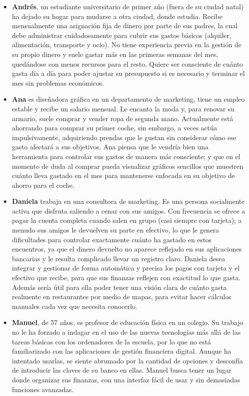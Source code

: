 \begin{itemize}
    \item \textbf{Andrés}, un estudiante universitario de primer año (fuera de su ciudad natal) ha dejado su hogar para mudarse a otra ciudad, donde estudia. Recibe mensualmente una asignación fija de dinero por parte de sus padres, la cual debe administrar cuidadosamente para cubrir sus gastos básicos (alquiler, alimentación, transporte y ocio). No tiene experiencia previa en la gestión de su propio dinero y suele gastar más en las primeras semanas del mes, quedándose con menos recursos para el resto. Quiere ser consciente de cuánto gasta día a día para poder ajustar su presupuesto si es necesario y terminar el mes sin problemas económicos.

    \item \textbf{Ana} es diseñadora gráfica en un departamento de marketing, tiene un empleo estable y recibe un salario mensual. Le encanta la moda y, para renovar su armario, suele comprar y vender ropa de segunda mano. Actualmente está ahorrando para comprar su primer coche, sin embargo, a veces actúa impulsivamente, adquiriendo prendas que le gustan sin considerar cómo ese gasto afectará a sus objetivos. Ana piensa que le vendría bien una herramienta para controlar sus gastos de manera más consciente; y que en el momento de duda al comprar pueda visualizar gráficos sencillos que muestren cuánto lleva gastado en el mes para mantenerse enfocada en su objetivo de ahorro para el coche.
    
    \item \textbf{Daniela} trabaja en una consultora de marketing. Es una persona socialmente activa que disfruta saliendo a cenar con sus amigos. Con frecuencia se ofrece a pagar la cuenta completa cuando salen en grupo (casi siempre con tarjeta); a menudo sus amigos le devuelven su parte en efectivo, lo que le genera dificultades para controlar exactamente cuánto ha gastado en estos encuentros, ya que el dinero devuelto no aparece reflejado en sus aplicaciones bancarias y le resulta complicado llevar un registro claro. Daniela desea integrar y gestionar de forma automática y precisa los pagos con tarjeta y el efectivo que recibe, para que sus finanzas reflejen con exactitud lo que gasta. Además sería útil para ella poder tener una visión clara de cuánto gasta realmente en restaurantes por medio de mapas, para evitar hacer cálculos manuales cada vez que necesita conocerlo.
    
    \item \textbf{Manuel}, de 57 años, es profesor de educación física en un colegio. Su trabajo no le ha forzado a indagar en el uso de las nuevas tecnologías más allá de las tareas básicas con los ordenadores de la escuela, por lo que no está familiarizado con las aplicaciones de gestión financiera digital. Aunque ha intentado usarlas, se siente abrumado por la cantidad de opciones y desconfía de introducir las claves de su banco en ellas. Manuel busca tener un lugar donde organizar sus finanzas, con una interfaz fácil de usar y sin demasiadas funciones avanzadas.
    
\end{itemize}

